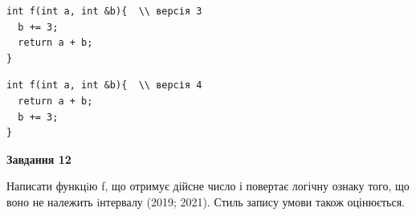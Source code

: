 \documentclass[12pt, ukrainian]{article}
\begin{document}
{\begin {large}
\begin{minipage}[t]{11.0cm}
\vspace{-8mm}\begin{verbatim}
int f(int a, int &b){  \\ версія 3
  b += 3;
  return a + b;
}
\end{verbatim}

\vspace{-8mm}\begin{verbatim}
int f(int a, int &b){  \\ версія 4
  return a + b;
  b += 3;
}
\end{verbatim}



\begin{center}
\textbf{Завдання 12}
\end{center}

Написати функцiю f, що отримує дійсне число і повертає логічну ознаку того, що воно не належить iнтервалу (2019; 2021). Стиль запису умови також оцінюється.\par

\end{minipage}

\end {large}}
\newpage
\end{document}
